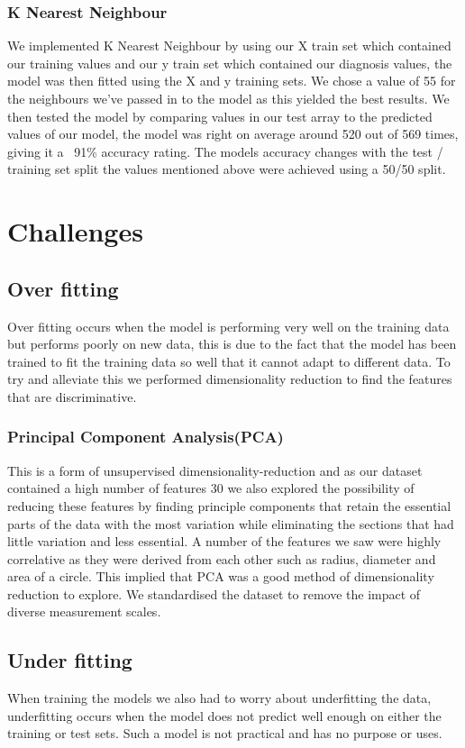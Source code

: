 \documentclass[conference]{IEEEtran}
\begin{document}
\subsubsection{K Nearest Neighbour}
We implemented K Nearest Neighbour by using our X train set which contained our training values and our y train set which contained our diagnosis values, the model was then fitted using the X and y training sets.  We chose a value of 55 for the neighbours we've passed in to the model as this yielded the best results.  We then tested the model by comparing values in our test array to the predicted values of our model, the model was right on average around 520 out of 569 times, giving it a ~91\% accuracy rating. The models accuracy changes with the test / training set split the values mentioned above were achieved using a 50/50 split.
\section{Challenges}
\subsection{Over fitting}
Over fitting occurs when the model is performing very well on the training data but performs poorly on new data, this is due to the fact that the model has been trained to fit the training data so well that it cannot adapt to different data. To try and alleviate this we performed dimensionality reduction to find the features that are discriminative.
\subsubsection{Principal Component Analysis(PCA)} This is a form of unsupervised dimensionality-reduction and as our dataset contained a high number of features 30 we also explored the possibility of reducing these features by finding principle components that retain the essential parts of the data with the most variation while eliminating the sections that had little variation and less essential. A number of the features we saw were highly correlative as they were  derived from each other such as radius, diameter and area of a circle. This implied that PCA was a good method of dimensionality reduction to explore. We standardised the dataset to remove the impact of diverse measurement scales.
\subsection{Under fitting}
When training the models we also had to worry about underfitting the data, underfitting occurs when the model does not predict well enough on either the training or test sets.  Such a model is not practical and has no purpose or uses.
\end{document}
